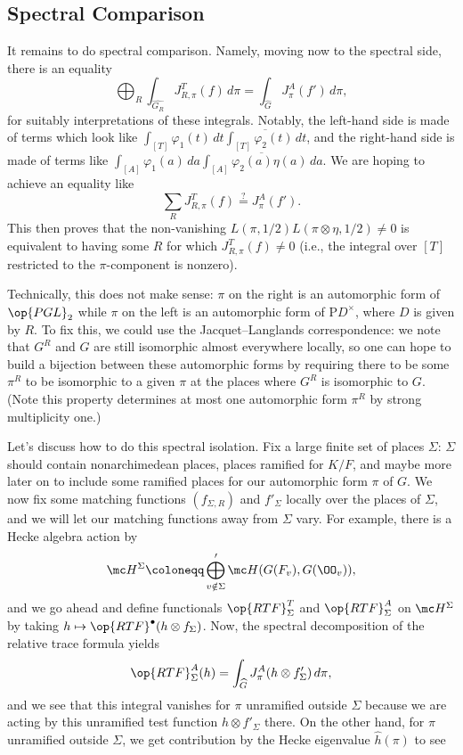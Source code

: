 \documentclass[../notes.tex]{subfiles}
\begin{document}
\subsection{Spectral Comparison}
It remains to do spectral comparison. Namely, moving now to the spectral side, there is an equality
\[\bigoplus_R\int_{\widehat{G_R}}J^T_{R,\pi}(f)\,d\pi=\int_{\widehat G}J_\pi^A(f')\,d\pi,\]
for suitably interpretations of these integrals. Notably, the left-hand side is made of terms which look like $\int_{[T]}\varphi_1(t)\,dt\overline{\int_{[T]}\varphi_2(t)\,dt}$, and the right-hand side is made of terms like $\int_{[A]}\varphi_1(a)\,da\overline{\int_{[A]}\varphi_2(a)\eta(a)\,da}$. We are hoping to achieve an equality like
\[\sum_RJ^T_{R,\pi}(f)\stackrel?=J_\pi^A(f').\]
This then proves that the non-vanishing $L(\pi,1/2)L(\pi\otimes\eta,1/2)\ne0$ is equivalent to having some $R$ for which $J_{R,\pi}^T(f)\ne0$ (i.e., the integral over $[T]$ restricted to the $\pi$-component is nonzero).
\begin{remark}
	Technically, this does not make sense: $\pi$ on the right is an automorphic form of $\op{PGL}_2$ while $\pi$ on the left is an automorphic form of $\mathrm PD^\times$, where $D$ is given by $R$. To fix this, we could use the Jacquet--Langlands correspondence: we note that $G^R$ and $G$ are still isomorphic almost everywhere locally, so one can hope to build a bijection between these automorphic forms by requiring there to be some $\pi^R$ to be isomorphic to a given $\pi$ at the places where $G^R$ is isomorphic to $G$. (Note this property determines at most one automorphic form $\pi^R$ by strong multiplicity one.)
\end{remark}
Let's discuss how to do this spectral isolation. Fix a large finite set of places $\Sigma$: $\Sigma$ should contain nonarchimedean places, places ramified for $K/F$, and maybe more later on to include some ramified places for our automorphic form $\pi$ of $G$. We now fix some matching functions $(f_{\Sigma,R})$ and $f'_\Sigma$ locally over the places of $\Sigma$, and we will let our matching functions away from $\Sigma$ vary. For example, there is a Hecke algebra action by
\[\mc H^\Sigma\coloneqq\bigoplus_{v\notin\Sigma}'\mc H(G(F_v),G(\OO_v)),\]
and we go ahead and define functionals $\op{RTF}^T_\Sigma$ and $\op{RTF}^A_\Sigma$ on $\mc H^\Sigma$ by taking $h\mapsto\op{RTF}^\bullet(h\otimes f_\Sigma)$. Now, the spectral decomposition of the relative trace formula yields
\[\op{RTF}^A_\Sigma(h)=\int_{\widehat G}J_\pi^A(h\otimes f'_\Sigma)\,d\pi,\]
and we see that this integral vanishes for $\pi$ unramified outside $\Sigma$ because we are acting by this unramified test function $h\otimes f'_\Sigma$ there. On the other hand, for $\pi$ unramified outside $\Sigma$, we get contribution by the Hecke eigenvalue $\widehat h(\pi)$ to see
\end{document}

